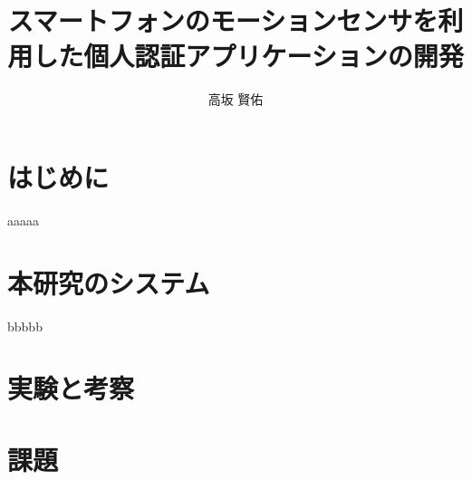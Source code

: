 \documentclass[11pt]{jarticle}
\title{スマートフォンのモーションセンサを利用した個人認証アプリケーションの開発}
\author{高坂 賢佑}
\begin{document}
\maketitle

\section{はじめに}
aaaaa

\section{本研究のシステム}
bbbbb

\section{実験と考察}

\section{課題}
\end{document}
